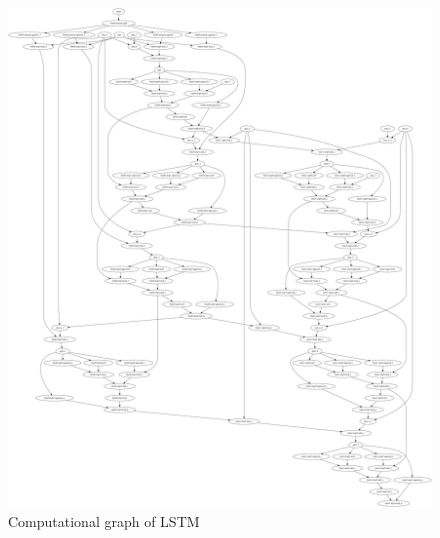 \begin{figure}[th]
\centering
\includegraphics[scale=0.1]{Figures/lstm_dataflow.png}
\decoRule
\caption[Computational Graph of LSTM]{Computational graph of LSTM}
\label{fig:comp_graph_lstm}
\end{figure}

